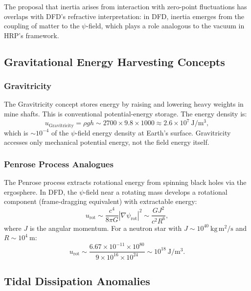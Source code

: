\documentclass[aps,prd,twocolumn,showpacs,preprintnumbers,superscriptaddress,nofootinbib]{revtex4-2}
\begin{document}
The proposal that inertia arises from interaction with zero-point
fluctuations has overlaps with DFD's refractive interpretation: in
DFD, inertia emerges from the coupling of matter to the $\psi$-field,
which plays a role analogous to the vacuum in HRP's framework.

\subsection{Gravitational Energy Harvesting Concepts}\label{sec:grav-harvest}

\subsubsection{Gravitricity~\cite{Gravitricity2020}}

The Gravitricity concept stores energy by raising and lowering heavy
weights in mine shafts.  This is conventional potential-energy
storage.  The energy density is:
\begin{equation}
u_{\mathrm{Gravitricity}} = \rho g h \sim 2700\times 9.8\times 1000
  \approx 2.6\times 10^7~\mathrm{J/m^3},
\end{equation}
which is $\sim 10^{-4}$ of the $\psi$-field energy density at Earth's
surface.  Gravitricity accesses only mechanical potential energy, not
the field energy itself.

\subsubsection{Penrose Process Analogues}

The Penrose process extracts rotational energy from spinning black holes
via the ergosphere.  In DFD, the $\psi$-field near a rotating mass
develops a rotational component (frame-dragging equivalent) with
extractable energy:
\begin{equation}
u_{\mathrm{rot}} \sim \frac{c^4}{8\pi G}|\nabla\psi_{\mathrm{rot}}|^2
  \sim \frac{G J^2}{c^2 R^6},
\end{equation}
where $J$ is the angular momentum.  For a neutron star with
$J \sim 10^{40}~\mathrm{kg\,m^2/s}$ and $R \sim 10^4~\mathrm{m}$:
\begin{equation}
u_{\mathrm{rot}} \sim \frac{6.67\times 10^{-11}\times 10^{80}}{9\times 10^{16}\times 10^{24}}
  \sim 10^{18}~\mathrm{J/m^3}.
\end{equation}

\subsection{Tidal Dissipation Anomalies}\label{sec:tidal-anomaly}
\end{document}
